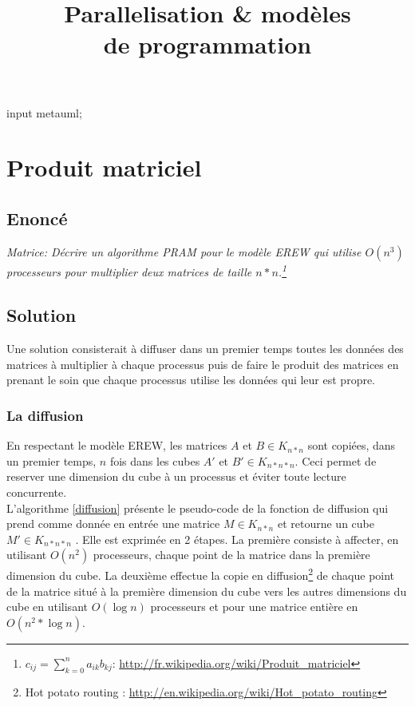 \documentclass[oneside,11pt]{article}
\title{Parallelisation \& modèles\\de programmation}
\begin{document}
\begin{empfile}

\begin{empcmds}
input metauml;
\end{empcmds}

\maketitle

\tableofcontents

\newpage

\section{Produit matriciel}

\subsection{Enoncé}
\textit{Matrice: Décrire un algorithme PRAM pour le modèle EREW qui utilise $O(n^3)$ processeurs pour multiplier deux matrices de taille $n*n$.\footnote{$c_{ij} = \sum_{k=0}^n a_{ik} b_{kj}$: \url{http://fr.wikipedia.org/wiki/Produit_matriciel}}}

\subsection{Solution}
Une solution consisterait à diffuser dans un premier temps toutes les données des matrices à multiplier à chaque processus puis de faire le produit des matrices en prenant le soin que chaque processus utilise les données qui leur est propre.

\subsubsection{La diffusion}
En respectant le modèle EREW, les matrices $A$ et $B \in K_{n*n}$ sont copiées, dans un premier temps, $n$ fois dans les cubes $A'$ et $B' \in K_{n*n*n}$. Ceci permet de reserver une dimension du cube à un processus et éviter toute lecture concurrente.\\

L'algorithme \ref{diffusion} présente le pseudo-code de la fonction de diffusion qui prend comme donnée en entrée une matrice $M \in K_{n*n}$ et retourne un cube $M' \in K_{n*n*n}$ . Elle est exprimée en 2 étapes. La première consiste à affecter, en utilisant $O(n^2)$ processeurs, chaque point de la matrice dans la première dimension du cube. La deuxième effectue la copie en diffusion\footnote{Hot potato routing : \url{http://en.wikipedia.org/wiki/Hot_potato_routing}} de chaque point de la matrice situé à la première dimension du cube vers les autres dimensions du cube en utilisant $O(\log{n})$ processeurs et pour une matrice entière en $O(n^2 * \log{n})$.


\end{empfile}
\end{document}

